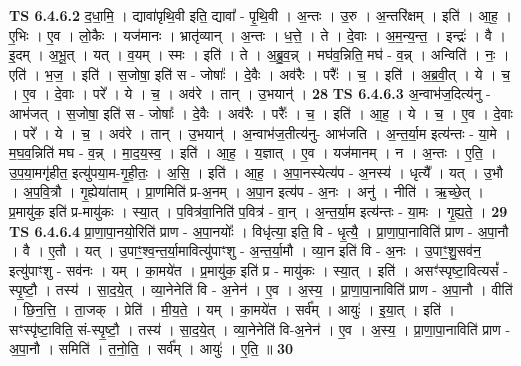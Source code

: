 \documentclass[17pt]{extarticle}
\begin{document}
                  \newline
                                \textbf{ TS 6.4.6.2} \newline
                  द॒धा॒मि॒ । द्यावा॑पृथि॒वी इति॒ द्यावा᳚ - पृ॒थि॒वी । अ॒न्तः । उ॒रु । अ॒न्तरि॑क्षम् । इति॑ । आ॒ह॒ । ए॒भिः । ए॒व । लो॒कैः । यज॑मानः । भ्रातृ॑व्यान् । अ॒न्तः । ध॒त्ते॒ । ते । दे॒वाः । अ॒म॒न्य॒न्त॒ । इन्द्रः॑ । वै । इ॒दम् । अ॒भू॒त् । यत् । व॒यम् । स्मः । इति॑ । ते । अ॒ब्रु॒व॒न्न् । मघ॑व॒न्निति॒ मघ॑ - व॒न्न् । अन्विति॑ । नः॒ । एति॑ । भ॒ज॒ । इति॑ । स॒जोषा॒ इति॑ स - जोषाः᳚ । दे॒वैः । अव॑रैः । परैः᳚ । च॒ । इति॑ । अ॒ब्र॒वी॒त् । ये । च॒ । ए॒व । दे॒वाः । परे᳚ । ये । च॒ । अव॑रे । तान् । उ॒भयान्॑ । \textbf{  28} \newline
                  \newline
                                \textbf{ TS 6.4.6.3} \newline
                  अ॒न्वाभ॑ज॒दित्य॑नु - आभ॑जत् । स॒जोषा॒ इति॑ स - जोषाः᳚ । दे॒वैः । अव॑रैः । परैः᳚ । च॒ । इति॑ । आ॒ह॒ । ये । च॒ । ए॒व । दे॒वाः । परे᳚ । ये । च॒ । अव॑रे । तान् । उ॒भयान्॑ । अ॒न्वाभ॑ज॒तीत्य॑नु- आभ॑जति । अ॒न्त॒र्या॒म इत्य॑न्तः - या॒मे । म॒घ॒व॒न्निति॑ मघ - व॒न्न् । मा॒द॒य॒स्व॒ । इति॑ । आ॒ह॒ । य॒ज्ञात् । ए॒व । यज॑मानम् । न । अ॒न्तः । ए॒ति॒ । उ॒प॒या॒मगृ॑हीत॒ इत्यु॑पया॒म-गृ॒ही॒तः॒ । अ॒सि॒ । इति॑ । आ॒ह॒ । अ॒पा॒नस्येत्य॑प - अ॒नस्य॑ । धृत्यै᳚ । यत् । उ॒भौ । अ॒प॒वि॒त्रौ । गृ॒ह्येया॑ताम् । प्रा॒णमिति॑ प्र-अ॒नम् । अ॒पा॒न इत्य॑प - अ॒नः । अनु॑ । नीति॑ । ऋ॒च्छे॒त् । प्र॒मायु॑क॒ इति॑ प्र-मायु॑कः । स्या॒त् । प॒वित्र॑वा॒निति॑ प॒वित्र॑ - वा॒न् । अ॒न्त॒र्या॒म इत्य॑न्तः - या॒मः । गृ॒ह्य॒ते॒ । \textbf{  29} \newline
                  \newline
                                \textbf{ TS 6.4.6.4} \newline
                  प्रा॒णा॒पा॒नयो॒रिति॑ प्राण - अ॒पा॒नयोः᳚ । विधृ॑त्या॒ इति॒ वि - धृ॒त्यै॒ । प्रा॒णा॒पा॒नाविति॑ प्राण - अ॒पा॒नौ । वै । ए॒तौ । यत् । उ॒पाꣳ॒॒श्व॒न्त॒र्या॒मावित्यु॑पाꣳशु - अ॒न्त॒र्या॒मौ । व्या॒न इति॑ वि - अ॒नः । उ॒पाꣳ॒॒शु॒सव॑न॒ इत्यु॑पाꣳशु - सव॑नः । यम् । का॒मये॑त । प्र॒मायु॑क॒ इति॑ प्र - मायु॑कः । स्या॒त् । इति॑ । असꣳ॑स्पृष्टा॒वित्यसं᳚ - स्पृ॒ष्टौ॒ । तस्य॑ । सा॒द॒ये॒त् । व्या॒नेनेति॑ वि - अ॒नेन॑ । ए॒व । अ॒स्य॒ । प्रा॒णा॒पा॒नाविति॑ प्राण - अ॒पा॒नौ । वीति॑ । छि॒न॒त्ति॒ । ता॒जक् । प्रेति॑ । मी॒य॒ते॒ । यम् । का॒मये॑त । सर्व᳚म् । आयुः॑ । इ॒या॒त् । इति॑ । सꣳस्पृ॑ष्टा॒विति॒ सं-स्पृ॒ष्टौ॒ । तस्य॑ । सा॒द॒ये॒त् । व्या॒नेनेति॑ वि-अ॒नेन॑ । ए॒व । अ॒स्य॒ । प्रा॒णा॒पा॒नाविति॑ प्राण - अ॒पा॒नौ । समिति॑ । त॒नो॒ति॒ । सर्व᳚म् । आयुः॑ । ए॒ति॒ ॥ \textbf{  30} \newline
\end{document}
